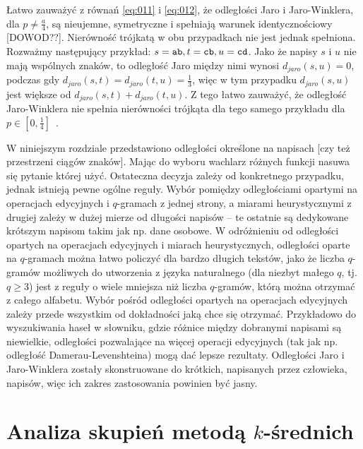 \documentclass{praca1}
\begin{document}
Łatwo zauważyć z równań \ref{eq:011} i \ref{eq:012}, że odległości Jaro i Jaro-Winklera, dla $p \neq \frac{a}{4}$, są nieujemne,  symetryczne i spełniają warunek identycznościowy [DOWOD??]. Nierówność trójkatą w obu przypadkach nie jest jednak spełniona. Rozważmy następujący przykład: $s = \verb|ab|, t = \verb|cb|, u = \verb|cd|$. Jako że napisy $s$ i $u$ nie mają wspólnych znaków, to odległość Jaro między nimi wynosi $d_{jaro}(s, u) = 0$, podczas gdy $d_{jaro}(s, t) = d_{jaro}(t, u) = \frac{1}{3}$, więc w tym przypadku $d_{jaro}(s, u)$ jest większe od $d_{jaro}(s, t) + d_{jaro}(t, u)$. Z tego łatwo zauważyć, że odległość Jaro-Winklera nie spełnia nierówności trójkąta  dla tego samego przykładu dla $p \in [0, \frac{1}{4}]$~\cite{Loo2014:stringdist}.


W niniejszym rozdziale przedstawiono odległości określone na napisach [czy też przestrzeni ciągów znaków]. Mając do wyboru wachlarz różnych funkcji nasuwa się pytanie której użyć. Ostateczna decyzja zależy od konkretnego przypadku, jednak istnieją pewne ogólne reguły. Wybór pomiędzy odległościami opartymi na operacjach edycyjnych i $q$-gramach z jednej strony, a miarami heurystycznymi z drugiej zależy w dużej mierze od długości napisów -- te ostatnie są dedykowane krótszym napisom takim jak np. dane osobowe. W odróżnieniu od odległości opartych na operacjach edycyjnych i miarach heurystycznych, odległości oparte na $q$-gramach można łatwo policzyć dla bardzo długich tekstów, jako że liczba $q$-gramów możliwych do utworzenia z języka naturalnego (dla niezbyt małego $q$, tj. $q \geq 3$) jest z reguły o wiele mniejsza niż liczba $q$-gramów, którą można otrzymać z całego alfabetu. Wybór pośród odległości opartych na operacjach edycyjnych zależy przede wszystkim od dokładności jaką chce się otrzymać. Przykładowo do wyszukiwania haseł w słowniku, gdzie różnice między dobranymi napisami są niewielkie, odległości pozwalające na więcej operacji edycyjnych (tak jak np. odległość Damerau-Levenshteina) mogą dać lepsze rezultaty. Odległości Jaro i Jaro-Winklera zostały skonstruowane do krótkich, napisanych przez człowieka, napisów, więc ich zakres zastosowania powinien być jasny.


\chapter{Analiza skupień metodą $k$-średnich}
\end{document}

